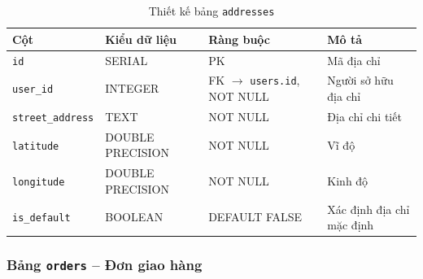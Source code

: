 \begin{table}[H]
\centering
\caption{Thiết kế bảng \texttt{addresses}}
\begin{tabularx}{\textwidth}{|l|l|Z|Z|}
\hline
\textbf{Cột} &
\textbf{Kiểu dữ liệu} &
\textbf{Ràng buộc} &
\textbf{Mô tả} \\ \hline

\texttt{id}
& SERIAL
& PK
& Mã địa chỉ \\ \hline

\texttt{user\_id}
& INTEGER
& FK $\rightarrow$ \texttt{users.id}, NOT NULL
& Người sở hữu địa chỉ \\ \hline

\texttt{street\_address}
& TEXT
& NOT NULL
& Địa chỉ chi tiết \\ \hline

\texttt{latitude}
& DOUBLE PRECISION
& NOT NULL
& Vĩ độ \\ \hline

\texttt{longitude}
& DOUBLE PRECISION
& NOT NULL
& Kinh độ \\ \hline

\texttt{is\_default}
& BOOLEAN
& DEFAULT FALSE
& Xác định địa chỉ mặc định \\ \hline

\end{tabularx}
\end{table}



\subsubsection{Bảng \texttt{orders} -- Đơn giao hàng}

